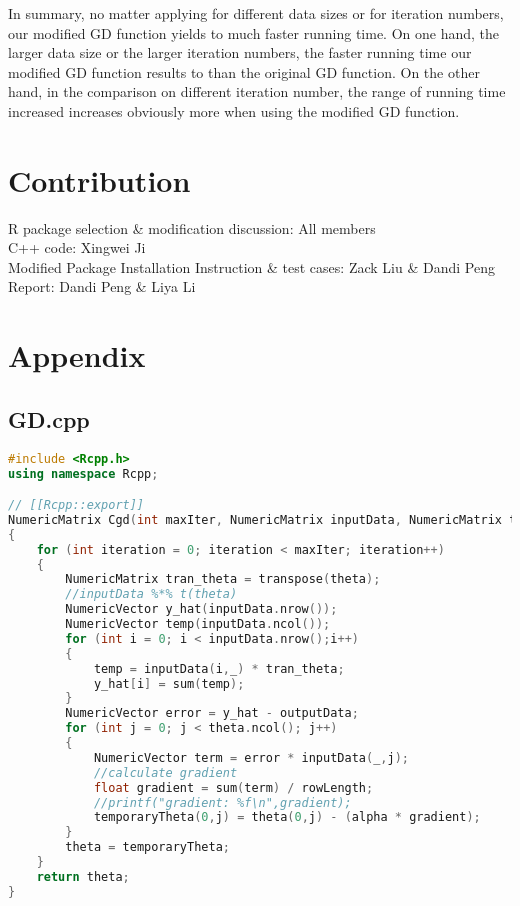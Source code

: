 \documentclass[12pt, letterpaper]{article} %
\begin{document}
\noindent
In summary, no matter applying for different data sizes or for iteration numbers, our modified GD function yields to much faster running time. On one hand, the larger data size or the larger iteration numbers, the faster running time our modified GD function results to than the original GD function. On the other hand, in the comparison on different iteration number, the range of running time increased increases obviously more when using the modified GD function. \\

\vspace*{-12mm}
\section{Contribution}
\vspace*{-5mm}
R package selection \& modification discussion: All members\\
\noindent
C++ code: Xingwei Ji\\
\noindent
Modified Package Installation Instruction \& test cases: Zack Liu \& Dandi Peng\\
\noindent
Report: Dandi Peng \& Liya Li

\newpage %
\section*{Appendix} %
\subsection*{GD.cpp}
\begin{lstlisting}[language=c++,basicstyle=\regular]
#include <Rcpp.h>
using namespace Rcpp;

// [[Rcpp::export]]
NumericMatrix Cgd(int maxIter, NumericMatrix inputData, NumericMatrix theta, int rowLength, NumericMatrix temporaryTheta, NumericVector outputData,float alpha)
{
    for (int iteration = 0; iteration < maxIter; iteration++)
    {
        NumericMatrix tran_theta = transpose(theta);
        //inputData %*% t(theta)
        NumericVector y_hat(inputData.nrow());
        NumericVector temp(inputData.ncol());
        for (int i = 0; i < inputData.nrow();i++)
        {
            temp = inputData(i,_) * tran_theta;
            y_hat[i] = sum(temp);
        }
        NumericVector error = y_hat - outputData;
        for (int j = 0; j < theta.ncol(); j++)
        {
            NumericVector term = error * inputData(_,j);
            //calculate gradient
            float gradient = sum(term) / rowLength;
            //printf("gradient: %f\n",gradient);
            temporaryTheta(0,j) = theta(0,j) - (alpha * gradient);
        }
        theta = temporaryTheta;
    }
    return theta;
}
\end{lstlisting}
\end{document}
